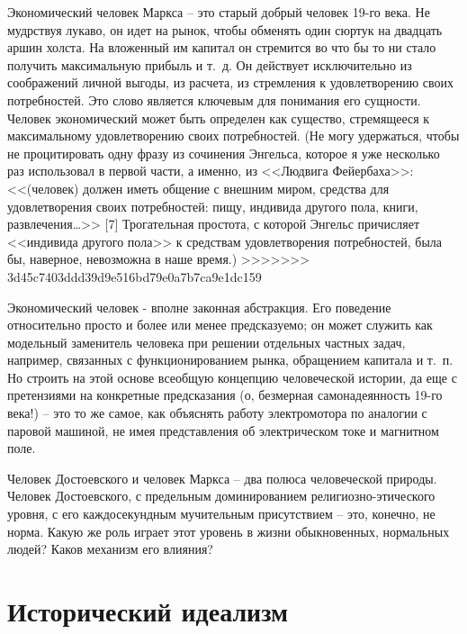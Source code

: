 \documentclass{book}
\begin{document}
Экономический человек Маркса -- это старый добрый чело­век 19-го века. Не мудрствуя лукаво, он идет на рынок, чтобы обменять один сюртук на двадцать аршин холста. На вложен­ный им капитал он стремится во что бы то ни стало получить максимальную прибыль и т.~д. Он действует исключительно из соображений личной выгоды, из расчета, из стремления к удов­летворению своих потребностей.  Это слово является ключевым для понимания его сущности. Человек экономический может быть определен как существо, стремящееся к максимальному удовлетворению своих потребностей. (Не могу удержаться, что­бы не процитировать одну фразу из сочинения Энгельса, кото­рое я уже несколько раз использовал в первой части, а именно, из <<Людвига Фейербаха>>: << (человек) должен иметь обще­ние с внешним миром, средства для удовлетворения своих по­требностей: пищу, индивида другого пола, книги, развлече­ния\ldots>> [7] Трогательная простота, с которой Энгельс причисляет <<индивида другого пола>> к средствам удовлетворения потреб­ностей, была бы, 
наверное, невозможна в наше время.)
>>>>>>> 3d45c7403ddd39d9e516bd79e0a7b7ca9e1dc159

Экономический человек - вполне законная абстракция. Его поведение относительно просто и более или менее пред­сказуемо; он может служить как модельный заменитель чело­века при решении отдельных частных задач, например, связанных с функционированием рынка, обращением капитала и т.~п. Но строить на этой основе всеобщую концепцию человеческой истории, да еще с претензиями на конкретные предсказания (о, безмерная самонадеянность 19-го века!) -- это то же самое, как объяснять работу электромотора по аналогии с паровой машиной, не имея представления об электрическом токе и маг­нитном поле.

Человек Достоевского и человек Маркса -- два полюса чело­веческой природы. Человек Достоевского, с предельным доми­нированием религиозно-этического уровня, с его каждосекундным мучительным присутствием -- это, конечно, не норма. Какую же роль играет этот уровень в жизни обыкновенных, нормальных людей? Каков механизм его влияния?



\section{Исторический идеализм}
\end{document}

